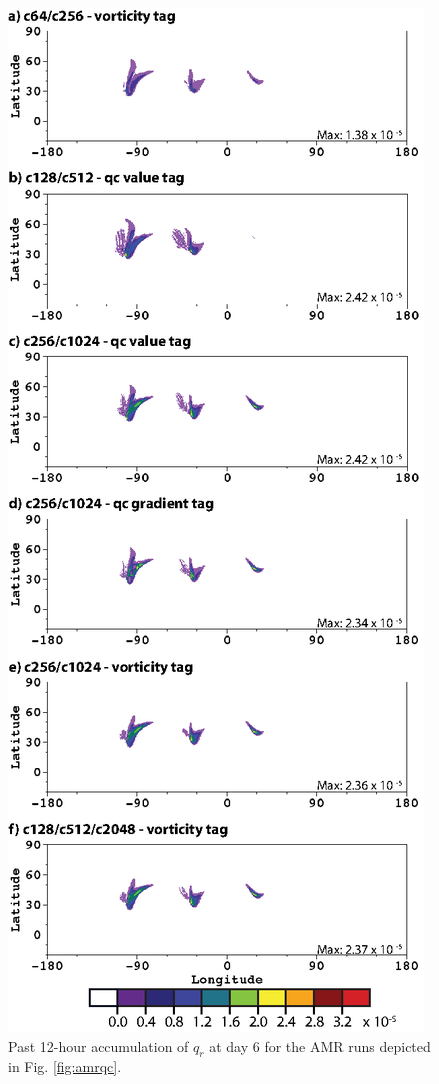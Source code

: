  \begin{figure}
   \centerline{%
   \noindent
   \includegraphics[width=\textwidth,height=\textheight,keepaspectratio]{Chap2/A_amr_qrdt-01}}
   \caption{Past 12-hour accumulation of $q_r$ at day 6 for the AMR runs depicted in Fig. \ref{fig:amrqc}.
   }
   \label{fig:amrqrdt}
\end{figure}

